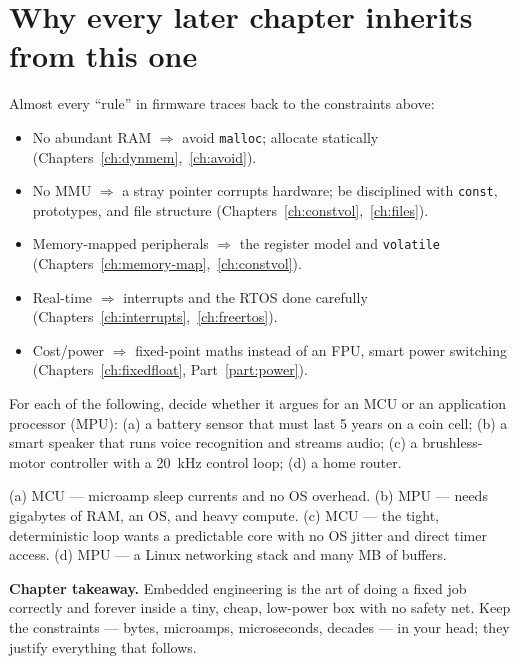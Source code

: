 \documentclass[11pt,a4paper,oneside]{book}
\newcommand{\code}[1]{\texttt{#1}}
\begin{document}
\section{Why every later chapter inherits from this one}
Almost every ``rule'' in firmware traces back to the constraints above:
\begin{itemize}[leftmargin=1.4cm]
  \item No abundant RAM $\Rightarrow$ avoid \code{malloc}; allocate statically
        (Chapters~\ref{ch:dynmem},~\ref{ch:avoid}).
  \item No MMU $\Rightarrow$ a stray pointer corrupts hardware; be disciplined
        with \code{const}, prototypes, and file structure
        (Chapters~\ref{ch:constvol},~\ref{ch:files}).
  \item Memory-mapped peripherals $\Rightarrow$ the register model and
        \code{volatile} (Chapters~\ref{ch:memory-map},~\ref{ch:constvol}).
  \item Real-time $\Rightarrow$ interrupts and the RTOS done carefully
        (Chapters~\ref{ch:interrupts},~\ref{ch:freertos}).
  \item Cost/power $\Rightarrow$ fixed-point maths instead of an FPU, smart
        power switching (Chapters~\ref{ch:fixedfloat}, Part~\ref{part:power}).
\end{itemize}

\begin{exercise}
For each of the following, decide whether it argues for an MCU or an
application processor (MPU): (a) a battery sensor that must last 5 years on a
coin cell; (b) a smart speaker that runs voice recognition and streams audio;
(c) a brushless-motor controller with a \qty{20}{\kilo\hertz} control loop;
(d) a home router.
\end{exercise}
\begin{solution}
(a) MCU --- microamp sleep currents and no OS overhead. (b) MPU --- needs
gigabytes of RAM, an OS, and heavy compute. (c) MCU --- the tight,
deterministic loop wants a predictable core with no OS jitter and direct timer
access. (d) MPU --- a Linux networking stack and many MB of buffers.
\end{solution}

\begin{keyidea}
\textbf{Chapter takeaway.} Embedded engineering is the art of doing a fixed job
correctly and forever inside a tiny, cheap, low-power box with no safety net.
Keep the constraints --- bytes, microamps, microseconds, decades --- in your
head; they justify everything that follows.
\end{keyidea}
\end{document}
